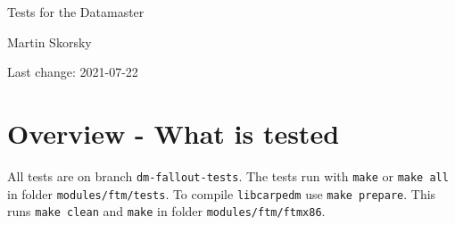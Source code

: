 \documentclass[12pt,a4paper]{report}
\begin{document}
\begin{titlepage}
\vspace{2cm}
\begin{center}
\Huge{Tests for the Datamaster}

\Large{Martin Skorsky}

\Large{Last change: 2021-07-22}
\end{center}
\vfill
\end{titlepage}

\tableofcontents

\chapter{Overview - What is tested}
All tests are on branch \texttt{dm-fallout-tests}. The tests run with \texttt{make} or \texttt{make all} in folder \texttt{modules/ftm/tests}.
To compile \texttt{libcarpedm} use \texttt{make prepare}. This runs \texttt{make clean} and \texttt{make} in folder \texttt{modules/ftm/ftmx86}.
\end{document}
